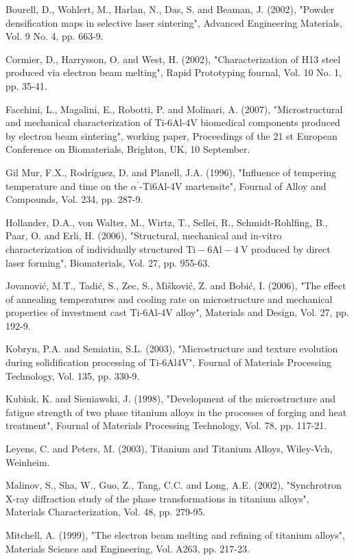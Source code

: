 \documentclass[10pt]{article}
\begin{document}
Bourell, D., Wohlert, M., Harlan, N., Das, S. and Beaman, J. (2002), "Powder densification maps in selective laser sintering", Advanced Engineering Materials, Vol. 9 No. 4, pp. 663-9.

Cormier, D., Harrysson, O. and West, H. (2002), "Characterization of H13 steel produced via electron beam melting", Rapid Prototyping fournal, Vol. 10 No. 1, pp. 35-41.

Facchini, L., Magalini, E., Robotti, P. and Molinari, A. (2007), "Microstructural and mechanical characterization of Ti-6Al-4V biomedical components produced by electron beam sintering", working paper, Proceedings of the 21 st European Conference on Biomaterials, Brighton, UK, 10 September.

Gil Mur, F.X., Rodríguez, D. and Planell, J.A. (1996), "Influence of tempering temperature and time on the $\alpha^{\prime}$-Ti6Al-4V martensite", Fournal of Alloy and Compounds, Vol. 234, pp. 287-9.

Hollander, D.A., von Walter, M., Wirtz, T., Sellei, R., Schmidt-Rohlfing, B., Paar, O. and Erli, H. (2006), "Structural, mechanical and in-vitro characterization of individually structured $\mathrm{Ti}-6 \mathrm{Al}-4 \mathrm{~V}$ produced by direct laser forming", Biomaterials, Vol. 27, pp. 955-63.

Jovanović, M.T., Tadić, S., Zec, S., Mišković, Z. and Bobić, I. (2006), "The effect of annealing temperatures and cooling rate on microstructure and mechanical properties of investment cast Ti-6Al-4V alloy", Materials and Design, Vol. 27, pp. 192-9.

Kobryn, P.A. and Semiatin, S.L. (2003), "Microstructure and texture evolution during solidification processing of Ti-6Al4V", Fournal of Materials Processing Technology, Vol. 135, pp. 330-9.

Kubiak, K. and Sieniawski, J. (1998), "Development of the microstructure and fatigue strength of two phase titanium alloys in the processes of forging and heat treatment", Fournal of Materials Processing Technology, Vol. 78, pp. 117-21.

Leyens, C. and Peters, M. (2003), Titanium and Titanium Alloys, Wiley-Vch, Weinheim.

Malinov, S., Sha, W., Guo, Z., Tang, C.C. and Long, A.E. (2002), "Synchrotron X-ray diffraction study of the phase transformations in titanium alloys", Materials Characterization, Vol. 48, pp. 279-95.

Mitchell, A. (1999), "The electron beam melting and refining of titanium alloys", Materials Science and Engineering, Vol. A263, pp. 217-23.
\end{document}
